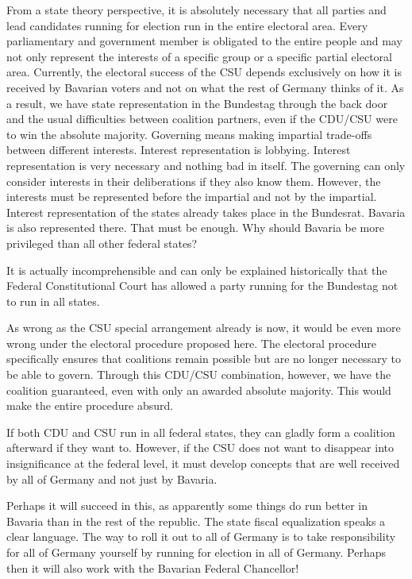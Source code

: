 From a state theory perspective, it is absolutely necessary that all parties and lead candidates running for election
run in the entire electoral area. Every parliamentary and
government member is obligated to the entire people and may not only represent the interests of a
specific group or a specific partial electoral area. Currently, the electoral success
of the CSU depends exclusively on how it is received by Bavarian voters and not on what the
rest of Germany thinks of it. As a result, we have state representation in the Bundestag through the back door
and the usual difficulties between coalition partners,
even if the CDU/CSU were to win the absolute majority. Governing means making impartial
trade-offs between different interests. Interest representation is lobbying.
Interest representation is very necessary and nothing bad in itself. The governing
can only consider interests in their deliberations if they also know them. However, the
interests must be represented before the impartial and not by the impartial.
Interest representation of the states already takes place in the Bundesrat. Bavaria is also
represented there. That must be enough. Why should Bavaria be more privileged than all other
federal states?

It is actually incomprehensible and can only be explained historically that the Federal Constitutional Court
has allowed a party running for the Bundestag not to run in all states.

As wrong as the CSU special arrangement already is now, it would be even more wrong under the
electoral procedure proposed here. The electoral procedure specifically ensures that coalitions remain
possible but are no longer necessary to be able to govern. Through this CDU/CSU combination, however, we have the coalition guaranteed, even with only an awarded absolute
majority. This would make the entire procedure absurd.

If both CDU and CSU run in
all federal states, they can gladly form a coalition afterward if they want to. However, if the
CSU does not want to disappear into insignificance at the federal level, it must develop
concepts that are well received by all of Germany and not just by Bavaria.

Perhaps it will succeed in this, as apparently some things do run better in Bavaria than
in the rest of the republic. The state fiscal equalization speaks a clear language. The way to
roll it out to all of Germany is to take responsibility for all of Germany yourself by
running for election in all of Germany. Perhaps then it will also work with the Bavarian
Federal Chancellor!

